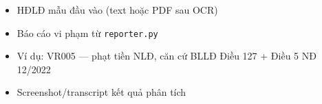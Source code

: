 \documentclass[../DoAn.tex]{subfiles}
\begin{document}
\begin{itemize}[nosep, leftmargin=*]
    \item HĐLĐ mẫu đầu vào (text hoặc PDF sau OCR)
    \item Báo cáo vi phạm từ \texttt{reporter.py}
    \item Ví dụ: VR005 --- phạt tiền NLĐ, căn cứ BLLĐ Điều 127 + Điều 5 NĐ 12/2022
    \item Screenshot/transcript kết quả phân tích
\end{itemize}
\end{document}
